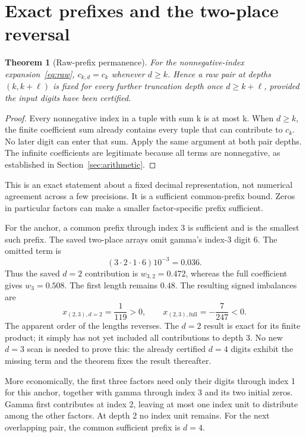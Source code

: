 \documentclass[11pt,a4paper]{article}
\newtheorem{theorem}{Theorem}[section]
\begin{document}
\clearpage
\section{Exact prefixes and the two-place reversal}
\label{sec:prefix}
\begin{theorem}[Raw-prefix permanence]
For the nonnegative-index expansion~\eqref{eq:raw}, $c_{k,d}=c_k$ whenever $d\ge k$. Hence a raw pair at depths $(k,k+\ell)$ is fixed for every further truncation depth once $d\ge k+\ell$, provided the input digits have been certified.
\end{theorem}
\begin{proof}
Every nonnegative index in a tuple with sum k is at most k. When $d\ge k$, the finite coefficient sum already contains every tuple that can contribute to $c_k$. No later digit can enter that sum. Apply the same argument at both pair depths. The infinite coefficients are legitimate because all terms are nonnegative, as established in Section~\ref{sec:arithmetic}.
\end{proof}
This is an exact statement about a fixed decimal representation, not numerical agreement across a few precisions. It is a sufficient common-prefix bound. Zeros in particular factors can make a smaller factor-specific prefix sufficient.

For the anchor, a common prefix through index 3 is sufficient and is the smallest such prefix. The saved two-place arrays omit gamma's index-3 digit 6. The omitted term is
\begin{equation}
(3\cdot2\cdot1\cdot6)10^{-3}=0.036.
\label{eq:omitted}
\end{equation}
Thus the saved $d=2$ contribution is $w_{3,2}=0.472$, whereas the full coefficient gives $w_3=0.508$. The first length remains $0.48$. The resulting signed imbalances are
\begin{equation}
x_{(2,3),d=2}=\frac1{119}>0,
\qquad x_{(2,3),\mathrm{full}}=-\frac7{247}<0.
\label{eq:reversal}
\end{equation}
The apparent order of the lengths reverses. The $d=2$ result is exact for its finite product; it simply has not yet included all contributions to depth 3. No new $d=3$ scan is needed to prove this: the already certified $d=4$ digits exhibit the missing term and the theorem fixes the result thereafter.

More economically, the first three factors need only their digits through index 1 for this anchor, together with gamma through index 3 and its two initial zeros. Gamma first contributes at index 2, leaving at most one index unit to distribute among the other factors. At depth 2 no index unit remains. For the next overlapping pair, the common sufficient prefix is $d=4$.
\end{document}
